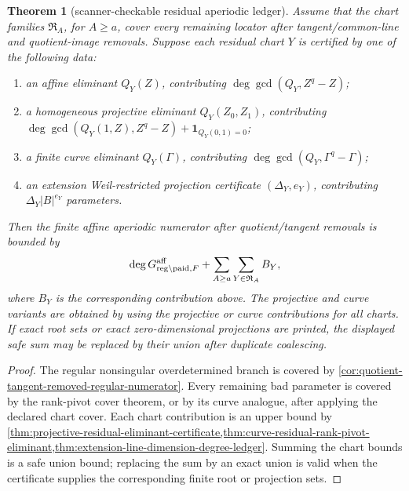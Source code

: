 \documentclass[11pt]{article}
\newtheorem{theorem}{Theorem}[section]
\theoremstyle{definition}
\theoremstyle{remark}
\newcommand{\B}{B}
\begin{document}
\begin{theorem}[scanner-checkable residual aperiodic ledger]
\label{thm:scanner-checkable-residual-aperiodic-ledger}
Assume that the chart families $\mathfrak R_A$, for $A\ge a$, cover every
remaining locator after tangent/common-line and quotient-image removals.  Suppose
each residual chart $Y$ is certified by one of the following data:
\begin{enumerate}[label=\textup{(\roman*)},leftmargin=2.2em]
\item an affine eliminant $Q_Y(Z)$, contributing
$\deg\gcd(Q_Y,Z^q-Z)$;
\item a homogeneous projective eliminant $Q_Y(Z_0,Z_1)$, contributing
$\deg\gcd(Q_Y(1,Z),Z^q-Z)+\mathbf 1_{Q_Y(0,1)=0}$;
\item a finite curve eliminant $Q_Y(\Gamma)$, contributing
$\deg\gcd(Q_Y,\Gamma^q-\Gamma)$;
\item an extension Weil-restricted projection certificate $(\Delta_Y,e_Y)$,
contributing $\Delta_Y|\B|^{e_Y}$ parameters.
\end{enumerate}
Then the finite affine aperiodic numerator after quotient/tangent removals is
bounded by
\[
        \deg G_{{\rm reg}\setminus{\rm paid},F}^{\rm aff}
        +\sum_{A\ge a}\sum_{Y\in\mathfrak R_A} B_Y,
\]
where $B_Y$ is the corresponding contribution above.  The projective and curve
variants are obtained by using the projective or curve contributions for all
charts.  If exact root sets or exact zero-dimensional projections are printed,
the displayed safe sum may be replaced by their union after duplicate
coalescing.
\end{theorem}

\begin{proof}
The regular nonsingular overdetermined branch is covered by
\cref{cor:quotient-tangent-removed-regular-numerator}.  Every remaining bad
parameter is covered by the rank-pivot cover theorem, or by its curve analogue,
after applying the declared chart cover.  Each chart contribution is an upper
bound by \cref{thm:projective-residual-eliminant-certificate,thm:curve-residual-rank-pivot-eliminant,thm:extension-line-dimension-degree-ledger}.  Summing the
chart bounds is a safe union bound; replacing the sum by an exact union is valid
when the certificate supplies the corresponding finite root or projection sets.
\end{proof}
\end{document}
